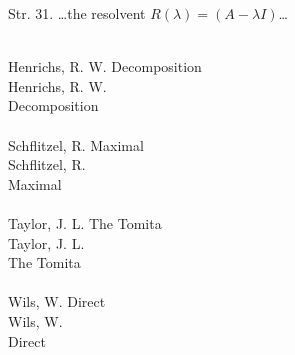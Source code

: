 \documentclass[a4paper,11pt]{article}
\begin{document}
\vspace{\VerSpaceSix}


Str. 31. \ldots the resolvent $R( \lambda ) = ( A - \lambda I )$\ldots

\noindent
{} \\
\Jest  Henrichs, R. W. Decomposition \\
\Powin Henrichs, R. W. \\
Decomposition \\
 \\
\Jest  Schflitzel, R. Maximal \\
\Powin Schflitzel, R. \\
Maximal \\
 \\
\Jest  Taylor, J. L. The Tomita \\
\Powin Taylor, J. L. \\
The Tomita \\
 \\
\Jest  Wils, W. Direct \\
\Powin Wils, W. \\
Direct \\



















{}






\end{document}
